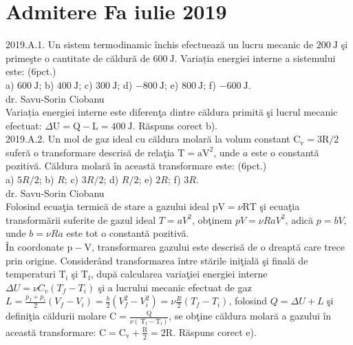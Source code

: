 
\section{Admitere Fa iulie 2019}

2019.A.1. Un sistem termodinamic închis efectuează un lucru mecanic de $200 \mathrm{~J}$ şi primeşte o cantitate de căldură de $600 \mathrm{~J}$. Variația energiei interne a sistemului este: (6pct.)\\ a) $600 \mathrm{~J}$; b) $400 \mathrm{~J}$; c) $300 \mathrm{~J}$; d) $-800 \mathrm{~J}$; e) $800 \mathrm{~J}$; f) $-600 \mathrm{~J}$.\\ dr. Savu-Sorin Ciobanu\\ Variația energiei interne este diferenţa dintre căldura primită şi lucrul mecanic efectuat: $\Delta \mathrm{U}=\mathrm{Q}-\mathrm{L}=400 \mathrm{~J}$. Răspuns corect b).\\

2019.A.2. Un mol de gaz ideal cu căldura molară la volum constant $\mathrm{C}_{\mathrm{v}}=3 \mathrm{R} / 2$ suferă o transformare descrisă de relaţia $\mathrm{T}=\mathrm{aV}^{2}$, unde $a$ este o constantă pozitivă. Căldura molară în această transformare este: (6pct.)\\ a) $5 R / 2$; b) $R$; c) $3 R / 2$; d) $R / 2$; e) $2 R$; f) $3 R$.\\ dr. Savu-Sorin Ciobanu\\ Folosind ecuaţia termică de stare a gazului ideal $\mathrm{pV}=\nu \mathrm{RT}$ şi ecuaţia transformării suferite de gazul ideal $T=a V^{2}$, obţinem $p V=\nu R a V^{2}$, adică $p=b V$, unde $b=\nu R a$ este tot o constantă pozitivă.\\ În coordonate $\mathrm{p}-\mathrm{V}$, transformarea gazului este descrisă de o dreaptă care trece prin origine. Considerând transformarea între stările iniţială şi finală de temperaturi $\mathrm{T}_{\mathrm{i}}$ şi $\mathrm{T}_{\mathrm{f}}$, după calcularea variaţiei energiei interne $\Delta U=\nu C_{v}\left(T_{f}-T_{i}\right)$ şi a lucrului mecanic efectuat de gaz $L=\frac{p_{f}+p_{i}}{2}\left(V_{f}-V_{i}\right)=\frac{b}{2}\left(V_{f}^{2}-V_{i}^{2}\right)=\nu \frac{R}{2}\left(T_{f}-T_{i}\right)$, folosind $Q=\Delta U+L$ şi definiţia căldurii molare $\mathrm{C}=\frac{\mathrm{Q}}{\nu\left(\mathrm{~T}_{\mathrm{f}}-\mathrm{T}_{\mathrm{i}}\right)}$, se obţine căldura molară a gazului în această transformare: $\mathrm{C}=\mathrm{C}_{\mathrm{v}}+\frac{\mathrm{R}}{2}=2 \mathrm{R}$. Răspuns corect e).\\


